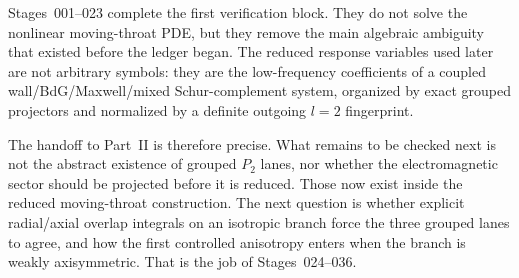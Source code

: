 Stages~001--023 complete the first verification block.  They do not solve the nonlinear moving-throat PDE, but they remove the main algebraic ambiguity that existed before the ledger began.  The reduced response variables used later are not arbitrary symbols: they are the low-frequency coefficients of a coupled wall/BdG/Maxwell/mixed Schur-complement system, organized by exact grouped projectors and normalized by a definite outgoing \(l=2\) fingerprint.

The handoff to Part~II is therefore precise.  What remains to be checked next is not the abstract existence of grouped \(P_2\) lanes, nor whether the electromagnetic sector should be projected before it is reduced.  Those now exist inside the reduced moving-throat construction.  The next question is whether explicit radial/axial overlap integrals on an isotropic branch force the three grouped lanes to agree, and how the first controlled anisotropy enters when the branch is weakly axisymmetric.  That is the job of Stages~024--036.
